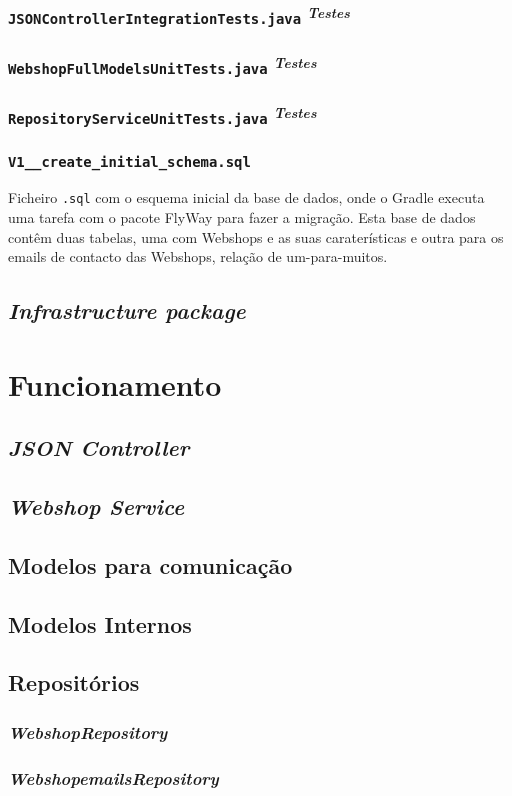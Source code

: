 \subsubsection*{\texttt{JSONControllerIntegrationTests.java} \textsuperscript{\textit{Testes}}}

\subsubsection*{\texttt{WebshopFullModelsUnitTests.java} \textsuperscript{\textit{Testes}}}

\subsubsection*{\texttt{RepositoryServiceUnitTests.java} \textsuperscript{\textit{Testes}}}

\subsubsection*{\texttt{V1\_\_create\_initial\_schema.sql}}

Ficheiro \texttt{.sql} com o esquema inicial da base de dados, onde o Gradle executa uma tarefa com o pacote FlyWay para fazer a migração. Esta base de dados contêm duas tabelas, uma com Webshops e as suas caraterísticas e outra para os emails de contacto das Webshops, relação de um-para-muitos.



\newpage

\subsection{\textit{\textit{Infrastructure} package}}\label{infra}

\section{Funcionamento}

\subsection{\textit{JSON Controller}}

\subsection{\textit{Webshop Service}}

\subsection{Modelos para comunicação}

\subsection{Modelos Internos}

\subsection{Repositórios}

\subsubsection{\textit{WebshopRepository}}

\subsubsection{\textit{WebshopemailsRepository}}
